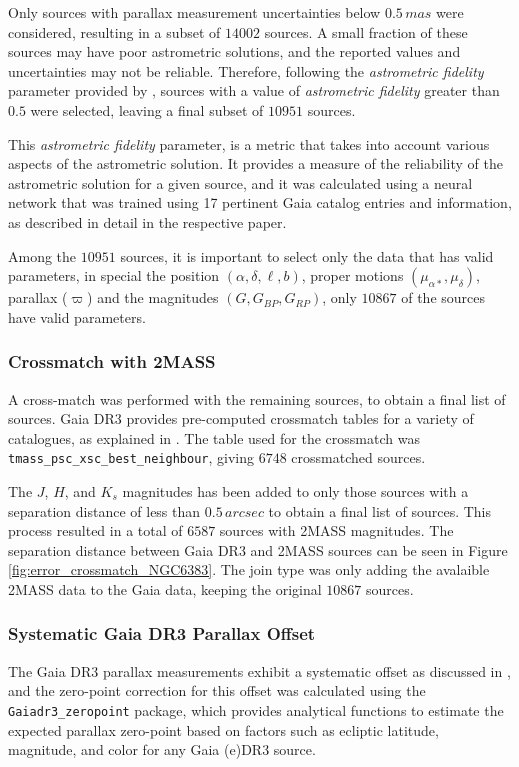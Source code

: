 \documentclass[fleqn,usenatbib,usedcolumn,useAMS]{mnras}
\begin{document}
Only sources with parallax measurement uncertainties below $0.5\, mas$ were considered, resulting in a subset of $14002$ sources. A small fraction of these sources may have poor astrometric solutions, and the reported values and uncertainties may not be reliable. Therefore, following the \textit{astrometric fidelity} parameter provided by \citet{2022MNRAS.510.2597R}, sources with a value of \textit{astrometric fidelity} greater than $0.5$ were selected, leaving a final subset of $10951$ sources.

This \textit{astrometric fidelity} parameter, is a metric that takes into account various aspects of the astrometric solution. It provides a measure of the reliability of the astrometric solution for a given source, and it was calculated using a neural network that was trained using 17 pertinent Gaia catalog entries and information, as described in detail in the respective paper.

Among the $10951$ sources, it is important to select only the data that has valid parameters, in special the position $(\alpha,\delta,\ell,b)$, proper motions $(\mu_{\alpha*},\mu_\delta)$, parallax ($\varpi$) and the magnitudes $(G, G_{BP}, G_{RP})$, only $10867$ of the sources have valid parameters.

\subsubsection{Crossmatch with 2MASS}
A cross-match was performed with the remaining sources, to obtain a final list of sources. Gaia DR3 provides pre-computed crossmatch tables for a variety of catalogues, as explained in \citet{2022gdr3.reptE..15M}. The table used for the crossmatch was \texttt{tmass\_psc\_xsc\_best\_neighbour}, giving $6748$ crossmatched sources.

The $J$, $H$, and $K_s$ magnitudes has been added to only those sources with a separation distance of less than $0.5\,arcsec$ to obtain a final list of sources. This process resulted in a total of $6587$ sources with 2MASS magnitudes. The separation distance between Gaia DR3 and 2MASS sources can be seen in Figure \ref{fig:error_crossmatch_NGC6383}. The join type was only adding the avalaible 2MASS data to the Gaia data, keeping the original $10867$ sources.


\subsubsection{Systematic Gaia DR3 Parallax Offset}
The Gaia DR3 parallax measurements exhibit a systematic offset as discussed in \citet{2021A&A...649A...4L}, and the zero-point correction for this offset was calculated using the \texttt{Gaiadr3\_zeropoint} package, which provides analytical functions to estimate the expected parallax zero-point based on factors such as ecliptic latitude, magnitude, and color for any Gaia (e)DR3 source.
\end{document}
